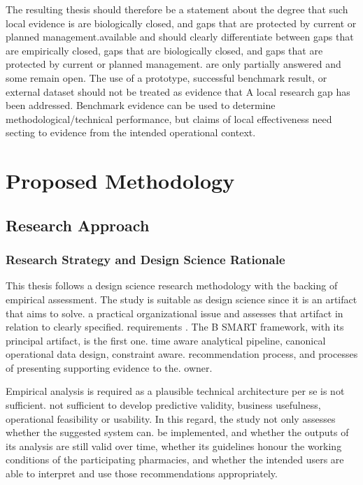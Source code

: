 \documentclass[a4paper,11pt,oneside]{book}
\theoremstyle{plain}
\theoremstyle{definition}
\theoremstyle{remark}
\begin{document}
The resulting thesis should therefore be a statement about the degree that such local evidence is are biologically closed, and gaps that are protected by current or planned management.available and should clearly differentiate between gaps that are empirically closed, gaps that are biologically closed, and gaps that are protected by current or planned management. are only partially answered and some remain open. The use of a prototype, successful benchmark result, or external dataset should not be treated as evidence that A local research gap has been addressed. Benchmark evidence can be used to determine methodological/technical performance, but claims of local effectiveness need secting to evidence from the intended operational context.

\clearpage


\chapter{Proposed Methodology}
\label{chapter_methodology}

\section{Research Approach}
\label{sec:research_approach}

\subsection{Research Strategy and Design Science Rationale}

This thesis follows a design science research methodology with the backing of empirical assessment. The study is suitable as design science since it is an artifact that aims to solve. a practical organizational issue and assesses that artifact in relation to clearly specified. requirements \cite{hevner2004design}. The B SMART framework, with its principal artifact, is the first one. time aware analytical pipeline, canonical operational data design, constraint aware. recommendation process, and processes of presenting supporting evidence to the. owner.

Empirical analysis is required as a plausible technical architecture per se is not sufficient. not sufficient to develop predictive validity, business usefulness, operational feasibility or usability. In this regard, the study not only assesses whether the suggested system can. be implemented, and whether the outputs of its analysis are still valid over time, whether its guidelines honour the working conditions of the participating pharmacies, and whether the intended users are able to interpret and use those recommendations appropriately.
\end{document}
